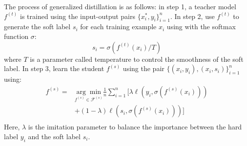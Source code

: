 The process of generalized distillation is as follows: in step 1, a teacher model ${f}^{(t)}$ is trained using the input-output pairs $\{x^*_i,y_i\}_{i=1}^n$. In step 2, use ${f}^{(t)}$ to generate the soft label $s_i$ for each training example $x_i$ using with the softmax function $\sigma$:
\begin{equation}\label{eq:softmax_T}
s_i=\sigma(f^{(t)}(x_i)/T)
\end{equation}
where $T$ is a parameter called temperature to control the smoothness of the soft label. In step 3, learn the student ${f}^{(s)}$ using the pair $\{\left(x_i,y_i\right),\left(x_i,s_i\right)\}_{i=1}^n$ using:
\begin{equation}\label{eq:distill}
\begin{aligned}
f^{(s)}=&\underset{f^{(s)} \in \mathcal{F}^{(s)}}{\arg \min}\frac{1}{n}\sum_{i=1}^{n}\bigg[\lambda\ell\left(y_i,\sigma(f^{(s)}(x_i))\right)\\
&+(1-\lambda)\ell\left(s_i,\sigma(f^{(s)}(x_i))\right)\bigg]\\
\end{aligned}
\end{equation}
Here, $\lambda$ is the imitation parameter to balance the importance between the hard label $y_i$ and the soft label $s_i$.

